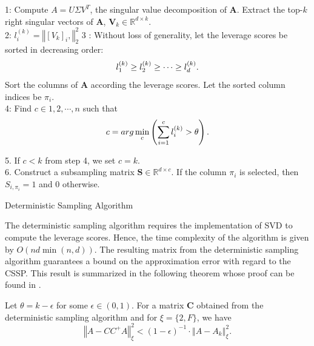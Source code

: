 \begin{algorithm}[t]
\SetAlgoLined
{}

1: Compute $A = U\Sigma V^T$, the singular value decomposition of $\textbf{A}$. Extract the top-$k$ right singular vectors of $\textbf{A}$, $\textbf{V}_k \in \mathds{R}^{d \times k}$.\\
2:  {
	$l_i^{(k)} = \left\Vert [V_k]_i, \right\Vert_2^2$
}
3 : Without loss of generality, let the leverage scores be sorted in decreasing order:
\begin{equation}
l_1^{(k)} \geq l_2^{(k)} \geq \cdots \geq l_d^{(k)}. \notag
\end{equation}
Sort the columns of $\textbf{A}$ according the leverage scores. Let the sorted column indices be $\pi_i$.\\ 
4: Find $c \in {1, 2, \cdots, n}$ such that 
\begin{equation}
c  = arg\min_c \left(\sum_{i = 1}^c l_i^{(k)} >\theta \right). \notag
\end{equation} 

5.  If $c<k$ from step 4, we set $c = k$. \\
6. Construct a subsampling matrix $\textbf{S} \in \mathds{R}^{d \times c}$. If the column $\pi_i$ is selected, then $S_{i,  \pi_i} = 1$ and 0 otherwise. \\
 \caption{Deterministic Sampling Algorithm}
\end{algorithm}

The deterministic sampling algorithm requires the implementation of SVD to compute the leverage scores. Hence, the time complexity of the algorithm is given by $O(nd \min({n,d}))$. The resulting matrix from the deterministic sampling algorithm guarantees a bound on the approximation error with regard to the CSSP. This result is summarized in the following theorem whose proof can be found in \cite{papailiopoulos_provable_2014}. \\

\begin{theorem}
Let $\theta = k - \epsilon$ for some $\epsilon \in (0,1)$. For a matrix $\textbf{C}$ obtained from the deterministic sampling algorithm and for $\xi = \{2,F\}$, we have
\begin{equation}
\label{eqn:thm1}
\left\Vert A - CC^+A \right\Vert_\xi^2 < (1-\epsilon)^{-1}\cdot \left\Vert A-A_k  \right\Vert_\xi^2. 
\end{equation}
\end{theorem}

